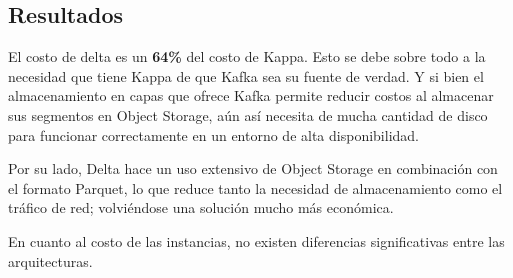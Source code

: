\newpage

\subsection{Resultados}

El costo de delta es un \textbf{64\%} del costo de Kappa. 
Esto se debe sobre todo a la necesidad que tiene Kappa de que Kafka sea su fuente de verdad.
Y si bien el almacenamiento en capas que ofrece Kafka permite reducir costos al almacenar sus segmentos en Object Storage,
aún así necesita de mucha cantidad de disco para funcionar correctamente en un entorno de alta disponibilidad.\newline

Por su lado, Delta hace un uso extensivo de Object Storage en combinación con el formato Parquet, lo que reduce 
tanto la necesidad de almacenamiento como el tráfico de red; volviéndose una solución mucho más económica.\newline

En cuanto al costo de las instancias, no existen diferencias significativas entre las arquitecturas. 
\newpage